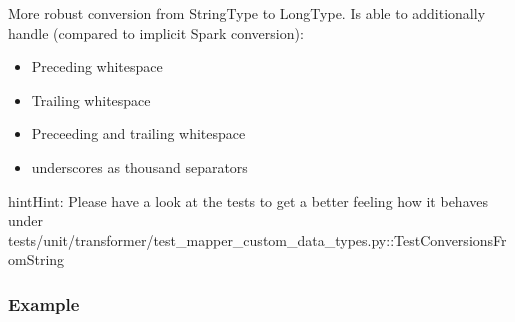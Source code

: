 \documentclass[a4paper,10pt, twoside,english]{sphinxmanual}
\begin{document}

\begin{fulllineitems}
\label{\detokenize{transformer/mapper:spooq2.transformer.mapper_custom_data_types._generate_select_expression_for_extended_string_to_long}}
More robust conversion from StringType to LongType.
Is able to additionally handle (compared to implicit Spark conversion):
\begin{itemize}
\item {} 
Preceding whitespace

\item {} 
Trailing whitespace

\item {} 
Preceeding and trailing whitespace

\item {} 
underscores as thousand separators

\end{itemize}

\begin{sphinxadmonition}{hint}{Hint:}
Please have a look at the tests to get a better feeling how it behaves under
tests/unit/transformer/test\_mapper\_custom\_data\_types.py::TestConversionsFromString
\end{sphinxadmonition}
\subsubsection*{Example}


\end{fulllineitems}
\end{document}
